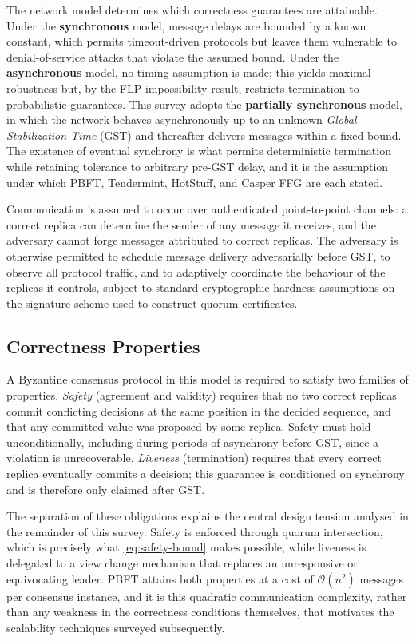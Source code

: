 The network model determines which correctness guarantees are attainable. Under the \textbf{synchronous} model, message delays are bounded by a known constant, which permits timeout-driven protocols but leaves them vulnerable to denial-of-service attacks that violate the assumed bound. Under the \textbf{asynchronous} model, no timing assumption is made; this yields maximal robustness but, by the FLP impossibility result, restricts termination to probabilistic guarantees. This survey adopts the \textbf{partially synchronous} model, in which the network behaves asynchronously up to an unknown \emph{Global Stabilization Time} (GST) and thereafter delivers messages within a fixed bound. The existence of eventual synchrony is what permits deterministic termination while retaining tolerance to arbitrary pre-GST delay, and it is the assumption under which PBFT, Tendermint, HotStuff, and Casper FFG are each stated.

Communication is assumed to occur over authenticated point-to-point channels: a correct replica can determine the sender of any message it receives, and the adversary cannot forge messages attributed to correct replicas. The adversary is otherwise permitted to schedule message delivery adversarially before GST, to observe all protocol traffic, and to adaptively coordinate the behaviour of the replicas it controls, subject to standard cryptographic hardness assumptions on the signature scheme used to construct quorum certificates.

\subsection{Correctness Properties}

A Byzantine consensus protocol in this model is required to satisfy two families of properties. \emph{Safety} (agreement and validity) requires that no two correct replicas commit conflicting decisions at the same position in the decided sequence, and that any committed value was proposed by some replica. Safety must hold unconditionally, including during periods of asynchrony before GST, since a violation is unrecoverable. \emph{Liveness} (termination) requires that every correct replica eventually commits a decision; this guarantee is conditioned on synchrony and is therefore only claimed after GST.

The separation of these obligations explains the central design tension analysed in the remainder of this survey. Safety is enforced through quorum intersection, which is precisely what \eqref{eq:safety-bound} makes possible, while liveness is delegated to a view change mechanism that replaces an unresponsive or equivocating leader. PBFT attains both properties at a cost of $\mathcal{O}(n^2)$ messages per consensus instance, and it is this quadratic communication complexity, rather than any weakness in the correctness conditions themselves, that motivates the scalability techniques surveyed subsequently.